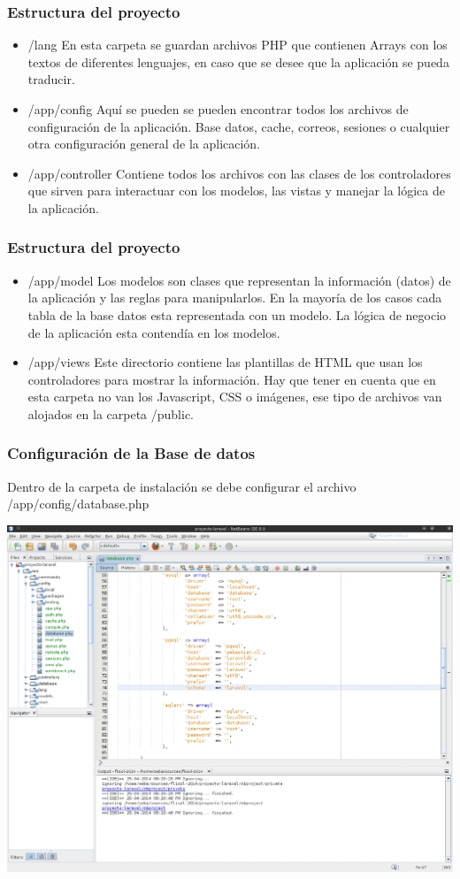 \documentclass[12pt]{beamer}
\begin{document}
\begin{frame}
 \frametitle{Estructura del proyecto}
 \begin{itemize}
  \item<2-> \alert{/lang} En esta carpeta se guardan archivos PHP que contienen Arrays con los textos de diferentes lenguajes, en caso que se desee que la aplicación se pueda traducir.
  \item<3-> \alert{/app/config} Aquí se pueden se pueden encontrar todos los archivos de configuración de la aplicación. Base datos, cache, correos, sesiones o cualquier otra configuración general de la aplicación.
  \item<4-> \alert{/app/controller} Contiene todos los archivos con las clases de los controladores que sirven para interactuar con los modelos, las vistas y manejar la lógica de la aplicación.
 \end{itemize}
\end{frame}


\begin{frame}
 \frametitle{Estructura del proyecto}
 \begin{itemize}
  \item<2-> \alert{/app/model} Los modelos son clases que representan la información (datos) de la aplicación y las reglas para manipularlos. En la mayoría de los casos cada tabla de la base datos esta representada con un modelo. La lógica de negocio de la aplicación esta contendía en los modelos.
  \item<3-> \alert{/app/views} Este directorio contiene las plantillas de HTML que usan los controladores para mostrar la información. Hay que tener en cuenta que en esta carpeta no van los Javascript, CSS o imágenes, ese tipo de archivos van alojados en la carpeta /public.
 \end{itemize}
\end{frame}


\begin{frame}
 \frametitle{Configuración de la Base de datos}
 Dentro de la carpeta de instalación se debe configurar el archivo /app/config/database.php
 \begin{center}
    \includegraphics[scale=0.35]{img/databasephp.png}
 \end{center}
\end{frame}
\end{document}
